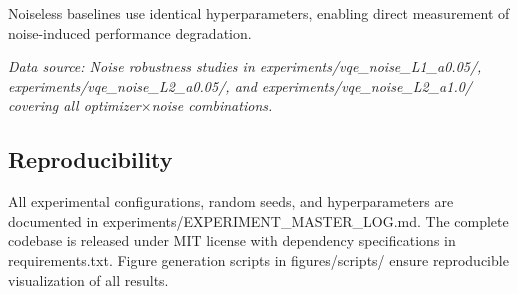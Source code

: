Noiseless baselines use identical hyperparameters, enabling direct measurement of noise-induced performance degradation.

\textit{Data source: Noise robustness studies in experiments/vqe\_noise\_L1\_a0.05/, experiments/vqe\_noise\_L2\_a0.05/, and experiments/vqe\_noise\_L2\_a1.0/ covering all optimizer$\times$noise combinations.}

\subsection{Reproducibility}

All experimental configurations, random seeds, and hyperparameters are documented in experiments/EXPERIMENT\_MASTER\_LOG.md.
The complete codebase is released under MIT license with dependency specifications in requirements.txt.
Figure generation scripts in figures/scripts/ ensure reproducible visualization of all results.

